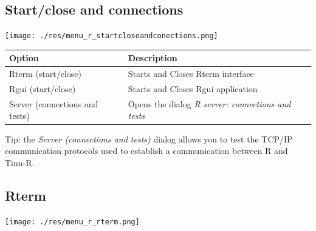 \subsection{Start/close and connections}

\texttt{[image: ./res/menu\_r\_startcloseandconections.png]}\\

\begin{scriptsize}
  \begin{tabularx}{\textwidth}{>{\hsize=0.5\hsize}X>{\hsize=0.7\hsize}X}\\
    \hline
    \textbf{Option} & \textbf{Description} \\
    \hline
    Rterm (start/close) & Starts and Closes Rterm interface \\
    Rgui (start/close) & Starts and Closes Rgui application \\
    Server (connections and tests) & Opens the dialog \textit{R server: connections and tests} \\
    \hline
  \end{tabularx}
\end{scriptsize}

Tip: the \textit{Server (connections and tests)} dialog allows you to test the
TCP/IP communication protocols used to establish a communication between
R and Tinn-R.


\hypertarget{menu_r_rterm}{}
\subsection{Rterm}

\texttt{[image: ./res/menu\_r\_rterm.png]}\\

